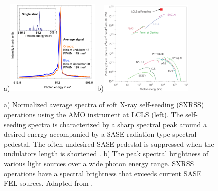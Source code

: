 \begin{figure}
	\centering
		a)\includegraphics[width=0.40\textwidth]{images/Soft-X-ray-self-seeding.pdf}
		b)\includegraphics[width=0.40\textwidth]{images/spectral-brightness-fletcher-2015-corr.jpg}
	\caption[Soft X-ray self-seeding spectra and brilliance of various light sources.]{a) Normalized average spectra of soft X-ray self-seeding (SXRSS) operations using the AMO instrument at LCLS (left). The self-seeding spectra is characterized by a sharp spectral peak around a desired energy accompanied by a SASE-radiation-type spectral pedestal. The often undesired SASE pedestal is suppressed when the undulators length is shortened \cite{Bucher-2014-Unpublished}. b) The peak spectral brightness of various light sources over a wide photon energy range. SXRSS operations have a spectral brightness that exceeds current SASE FEL sources. Adapted from \cite{Fletcher-2015-NatPho,}.}
	\label{fig:soft-xray-self-seeding}
\end{figure}
%
